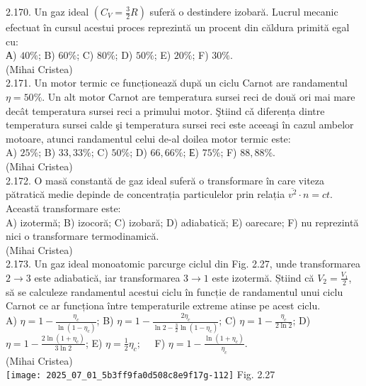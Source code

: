 2.170. Un gaz ideal $\left(C_{V}=\frac{3}{2} R\right)$ suferă o destindere izobară. Lucrul mecanic efectuat în cursul acestui proces reprezintă un procent din căldura primită egal cu:\\ А) $40 \%$; B) $60 \%$; C) $80 \%$; D) $50 \%$; E) $20 \%$; F) $30 \%$.\\ (Mihai Cristea)\\

2.171. Un motor termic ce funcționează după un ciclu Carnot are randamentul $\eta=50 \%$. Un alt motor Carnot are temperatura sursei reci de două ori mai mare decât temperatura sursei reci a primului motor. Ştiind cǎ diferența dintre temperatura sursei calde şi temperatura sursei reci este aceeaşi în cazul ambelor motoare, atunci randamentul celui de-al doilea motor termic este:\\ A) $25 \%$; B) $33,33 \%$; C) $50 \%$; D) $66,66 \%$; Е) $75 \%$; F) $88,88 \%$.\\ (Mihai Cristea)\\

2.172. O masă constantă de gaz ideal suferă o transformare în care viteza pătratică medie depinde de concentrația particulelor prin relația $\overline{v^{2}} \cdot n=c t$. Această transformare este:\\ A) izotermă; B) izocoră; C) izobară; D) adiabatică; E) oarecare; F) nu reprezintă nici o transformare termodinamică.\\ (Mihai Cristea)\\

2.173. Un gaz ideal monoatomic parcurge ciclul din Fig. 2.27, unde transformarea $2 \rightarrow 3$ este adiabatică, iar transformarea $3 \rightarrow 1$ este izotermă. Știind că $V_{2}=\frac{V_{1}}{2}$, să se calculeze randamentul acestui ciclu în funcție de randamentul unui ciclu Carnot ce ar funcționa între temperaturile extreme atinse pe acest ciclu.\\ A) $\eta=1-\frac{\eta_{c}}{\ln \left(1-\eta_{c}\right)}$; B) $\eta=1-\frac{2 \eta_{c}}{\ln 2-\frac{3}{2} \ln \left(1-\eta_{c}\right)}$; C) $\eta=1-\frac{\eta_{c}}{2 \ln 2}$; D) $\eta=1-\frac{2 \ln \left(1+\eta_{c}\right)}{3 \ln 2}$; E) $\eta=\frac{1}{2} \eta_{c} ; \quad$ F) $\eta=1-\frac{\ln \left(1+\eta_{c}\right)}{\eta_{c}}$.\\ (Mihai Cristea)\\ \texttt{[image: 2025\_07\_01\_5b3ff9fa0d508c8e9f17g-112]} Fig. 2.27\\

